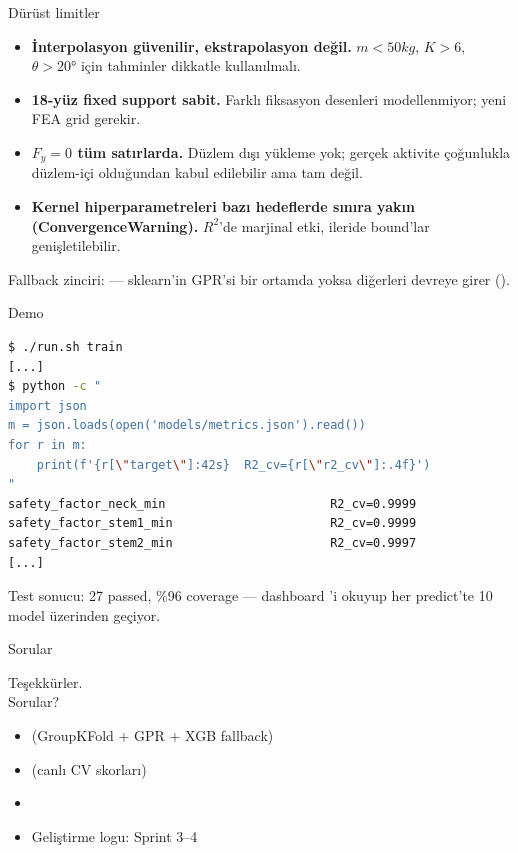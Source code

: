 \begin{frame}{Dürüst limitler}
  \begin{itemize}
    \item \textbf{İnterpolasyon güvenilir, ekstrapolasyon değil.}
          \(m < 50\unit{kg}\), \(K > 6\), \(\theta > 20°\) için tahminler
          dikkatle kullanılmalı.
    \item \textbf{18-yüz fixed support sabit.} Farklı fiksasyon
          desenleri modellenmiyor; yeni FEA grid gerekir.
    \item \textbf{\(F_y = 0\) tüm satırlarda.} Düzlem dışı yükleme yok;
          gerçek aktivite çoğunlukla düzlem-içi olduğundan kabul edilebilir
          ama tam değil.
    \item \textbf{Kernel hiperparametreleri bazı hedeflerde sınıra yakın
          (ConvergenceWarning).} \(R^2\)'de marjinal etki, ileride bound'lar
          genişletilebilir.
  \end{itemize}
  \vspace{0.4cm}
  \footnotesize
  Fallback zinciri:  ---
  sklearn'in GPR'si bir ortamda yoksa diğerleri devreye girer
  ().
\end{frame}

\begin{frame}[fragile]{Demo}
\begin{lstlisting}[language=bash, basicstyle=\ttfamily\small]
$ ./run.sh train
[...]
$ python -c "
import json
m = json.loads(open('models/metrics.json').read())
for r in m:
    print(f'{r[\"target\"]:42s}  R2_cv={r[\"r2_cv\"]:.4f}')
"
safety_factor_neck_min                       R2_cv=0.9999
safety_factor_stem1_min                      R2_cv=0.9999
safety_factor_stem2_min                      R2_cv=0.9997
[...]
\end{lstlisting}
  \vspace{0.4cm}
  Test sonucu: \alert{27 passed}, \%96 coverage --- dashboard 'i okuyup
  her predict'te 10 model üzerinden geçiyor.
\end{frame}

\begin{frame}{Sorular}
  \vfill
  \begin{center}
    \Large Teşekkürler.\\[0.4cm]
    \normalsize Sorular?
  \end{center}
  \vfill
  \scriptsize
  \begin{itemize}
    \item {} (GroupKFold + GPR + XGB fallback)
    \item {} (canlı CV skorları)
    \item {}
    \item Geliştirme logu:  Sprint 3--4
  \end{itemize}
\end{frame}


